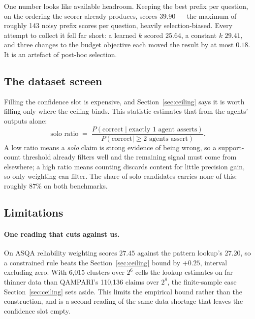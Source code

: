\documentclass{article}
\begin{document}
One number looks like available headroom. Keeping the best prefix per question, on the ordering the scorer already produces, scores $39.90$ --- the maximum of roughly 143 noisy prefix scores per question, heavily selection-biased. Every attempt to collect it fell far short: a learned $k$ scored $25.64$, a constant $k$ $29.41$, and three changes to the budget objective each moved the result by at most $0.18$. %
It is an artefact of post-hoc selection.

\subsection{The dataset screen}
\label{sec:screen}

Filling the confidence slot is expensive, and Section~\ref{sec:ceiling} says it is worth filling only where the ceiling binds. This statistic estimates that from the agents' outputs alone:
\[
  \text{solo ratio} \;=\; \frac{P(\mathrm{correct} \mid \text{exactly 1 agent asserts})}{P(\mathrm{correct} \mid \geq 2 \text{ agents assert})}.
\]
A low ratio means a \emph{solo} claim is strong evidence of being wrong, so a support-count threshold already filters well and the remaining signal must come from elsewhere; a high ratio means counting discards content for little precision gain, so only weighting can filter. The share of solo candidates carries none of this: roughly $87\%$ on both benchmarks.

\subsection{Limitations}
\label{sec:limitations}

\paragraph{One reading that cuts against us.}
On ASQA reliability weighting scores $27.45$ against the pattern lookup's $27.20$, so a constrained rule beats the Section~\ref{sec:ceiling} bound by $+0.25$, interval excluding zero. With 6,015 clusters over $2^6$ cells the lookup estimates on far thinner data than QAMPARI's 110,136 claims over $2^8$, the finite-sample case Section~\ref{sec:ceiling} sets aside. This limits the empirical bound rather than the construction, and is a second reading of the same data shortage that leaves the confidence slot empty. %
\end{document}
